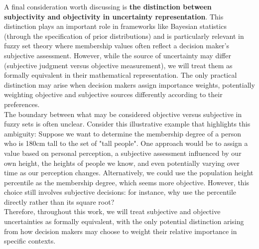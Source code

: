 A final consideration worth discussing is \textbf{the distinction between subjectivity and objectivity in uncertainty representation}. 
This distinction plays an important role in frameworks like Bayesian statistics (through the specification of prior distributions) and is particularly relevant in fuzzy set theory where membership values often reflect a decision maker's subjective assessment. However, while the source of uncertainty may differ (subjective judgment versus objective measurement), we will treat them as formally equivalent in their mathematical representation. The only practical distinction may arise when decision makers assign importance weights, potentially weighting objective and subjective sources differently according to their preferences.\\

The boundary between what may be considered objective versus subjective in fuzzy sets is often unclear. Consider this illustrative example that highlights this ambiguity:
Suppose we want to determine the membership degree of a person who is 180cm tall to the set of "tall people". One approach would be to assign a value based on personal perception, a subjective assessment influenced by our own height, the heights of people we know, and even potentially varying over time as our perception changes. Alternatively, we could use the population height percentile as the membership degree, which seems more objective. However, this choice still involves subjective decisions: for instance, why use the percentile directly rather than its square root?\\

Therefore, throughout this work, we will treat subjective and objective uncertainties as formally equivalent, with the only potential distinction arising from how decision makers may choose to weight their relative importance in specific contexts.